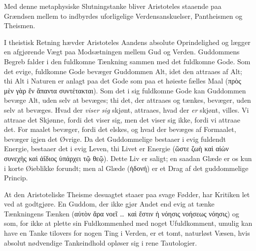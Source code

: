 \documentclass[12pt,a4paper]{book}
\begin{document}
Med denne metaphysiske Slutningstanke bliver Aristoteles staaende paa
Grændsen mellem to indbyrdes uforligelige Verdensanskuelser,
Pantheismen og Theismen.

I theistisk Retning hævder Aristoteles Aandens absolute Oprindelighed
og lægger en afgjørende Vægt paa Modsætningen mellem Gud og Verden.
Guddommens Begreb falder i den fuldkomne Tænkning sammen med det
fuldkomne Gode. Som det evige, fuldkomne Gode bevæger Guddommen Alt,
idet den attraaes af Alt; thi Alt i Naturen er anlagt paa det Gode som
paa et høieste fælles Maal (πρὸς μὲν γὰρ ἕν ἅπαντα συντέτακται). Som
det i sig fuldkomne Gode kan Guddommen bevæge Alt, uden selv at
bevæges; thi det, der attraaes og tænkes, bevæger, uden selv at
bevæges. Hvad der \emph{viser sig} skjønt, attraaes, hvad der
\emph{er} skjønt, villes. Vi attraae det Skjønne, fordi det viser sig,
men det viser sig ikke, fordi vi attraae det. For\-%
maalet bevæger, fordi det elskes, og hvad der bevæges af Formaalet,
bevæger igjen det Øvrige. Da det Guddommelige bestaaer i evig fuldendt
Energie, bestaaer det i evig Leven, thi Livet er Energie (ὥστε ζωὴ καὶ
αἰὼν συνεχὴς καὶ ἀΐδιος ὑπάρχει τῷ θεῷ). Dette Liv er saligt; en saadan
Glæde er os kun i korte Øieblikke forundt; men al Glæde (ἡδονή) er et
Drag af det guddommelige Princip.

At den Aristoteliske Theisme desuagtet staaer paa svage Fødder, har
Kritiken let ved at godtgjøre. En Guddom, der ikke gjør Andet end evig
at tænke Tænkningens Tænken (αὑτὸν ἄρα νοεῖ \ldots\ καὶ ἔστιν ἡ νόησις
νοήσεως νόησις) og som, for ikke at plette sin Fuldkommenhed med noget
Ufuldkomment, umulig kan have en Tanke tilovers for nogen Ting i
Verden, er et tomt, naturløst Væsen, hvis absolut nødvendige
Tankeindhold opløser sig i rene Tautologier.
\end{document}
